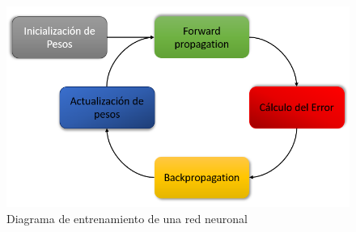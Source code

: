 \documentclass[14pt,a4paper]{report}
\begin{document}
 \begin{figure}[h]
  \centering
  \includegraphics[scale=0.7]{../diagrama-NN.png} 
  \caption{Diagrama de entrenamiento de una red neuronal}
  \label{fig:neural-network}
\end{figure}
\end{document}

